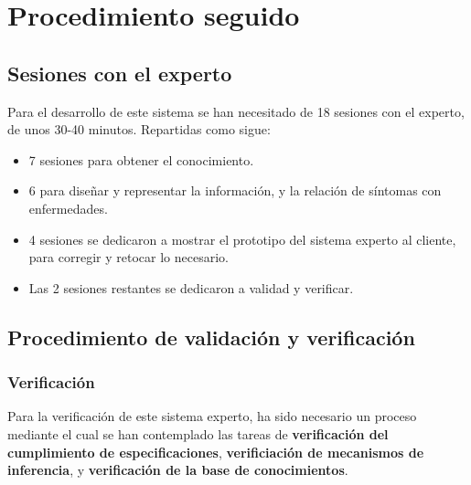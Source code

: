 
\chapter{Procedimiento seguido}

\section{Sesiones con el experto}

Para el desarrollo de este sistema se han necesitado de 18 sesiones con el experto, de unos 30-40 minutos. Repartidas como sigue:

\begin{itemize}
  \item 7 sesiones para obtener el conocimiento.
  \item 6 para diseñar y representar la información, y la relación de síntomas con enfermedades.
  \item 4 sesiones se dedicaron a mostrar el prototipo del sistema experto al cliente, para corregir y retocar lo necesario.
  \item Las 2 sesiones restantes se dedicaron a validad y verificar.
\end{itemize}

\section{Procedimiento de validación y verificación}

\subsection{Verificación}
\label{sub:Verificación}

Para la verificación de este sistema experto, ha sido necesario un proceso mediante el cual se han contemplado las tareas de \textbf{verificación del cumplimiento de especificaciones}, \textbf{verificiación de mecanismos de inferencia}, y \textbf{verificación de la base de conocimientos}.

